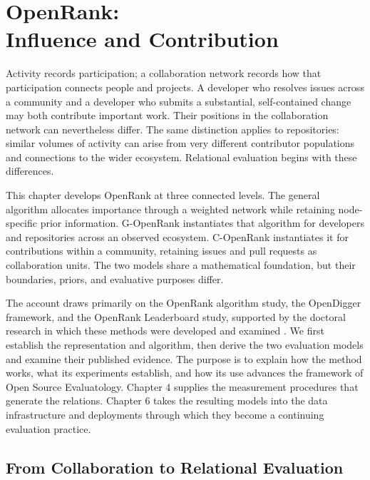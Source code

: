 \chapter[OpenRank: Influence and Contribution]{OpenRank:\\Influence and Contribution}
\label{ch:five}

Activity records participation; a collaboration network records how that participation connects people and projects. A developer who resolves issues across a community and a developer who submits a substantial, self-contained change may both contribute important work. Their positions in the collaboration network can nevertheless differ. The same distinction applies to repositories: similar volumes of activity can arise from very different contributor populations and connections to the wider ecosystem. Relational evaluation begins with these differences.

This chapter develops OpenRank at three connected levels. The general algorithm allocates importance through a weighted network while retaining node-specific prior information. G-OpenRank instantiates that algorithm for developers and repositories across an observed ecosystem. C-OpenRank instantiates it for contributions within a community, retaining issues and pull requests as collaboration units. The two models share a mathematical foundation, but their boundaries, priors, and evaluative purposes differ.

The account draws primarily on the OpenRank algorithm study, the OpenDigger framework, and the OpenRank Leaderboard study, supported by the doctoral research in which these methods were developed and examined \citep{han2026rank,wang2026digger,zhao2024,zhao2025thesis,xia2024thesis}. We first establish the representation and algorithm, then derive the two evaluation models and examine their published evidence. The purpose is to explain how the method works, what its experiments establish, and how its use advances the framework of Open Source Evaluatology. Chapter 4 supplies the measurement procedures that generate the relations. Chapter 6 takes the resulting models into the data infrastructure and deployments through which they become a continuing evaluation practice.

\section{From Collaboration to Relational Evaluation}
\label{sec:ch5-meaning}

